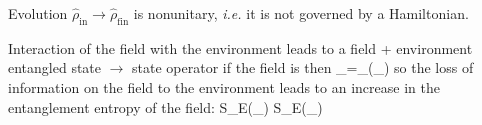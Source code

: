 \documentclass[12pt]{article}
\begin{document}
Evolution $\hat{\rho}_{\text {in}} \rightarrow \hat{\rho}_{\text {fin}}$ is nonunitary, 
\textit{i.e.} it is not governed by a Hamiltonian.

Interaction of the field with the environment leads
to a field + environment entangled state
$\rightarrow$ state operator if the field is then
\be
\hat{\rho}_{}=\Tr_{}\left(\hat{\rho}_{}\right)
\ee
so the loss of information on the field to
the environment leads to an
increase in the entanglement entropy
of the field:
\be
S_{E}\left(\hat{\rho}_{}\right) \geqslant S_{E}\left(\hat{\rho}_{}\right)
\ee
\end{document}
